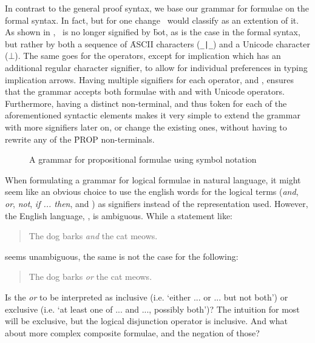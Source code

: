 \documentclass[manual.tex]{subfiles}
\begin{document}
In contrast to the general proof syntax, we base our grammar for
 formulae on the formal syntax. In fact, but for one change \ours\ would 
 classify as an extention of it.
 As shown in , \abs\ is no longer signified by
 \f{bot}, as is the case in the formal syntax, but rather by both a sequence 
 of \f{ASCII} characters (\verb+_|_+) and a Unicode character (\(\bot\)). 
 The same goes for the operators, except for implication which has an
 additional regular character signifier, to allow for individual preferences
 in typing implication arrows. Having multiple signifiers for each
 operator, and , ensures that the grammar
 accepts both formulae with  and with Unicode operators.
 Furthermore, having a distinct non-terminal, and thus \f{token}
 for each of the aforementioned syntactic elements makes it
 very simple to extend the grammar with more signifiers later on, or change
 the existing ones, without having to rewrite any of the \f{PROP} 
 non-terminals.

\begin{figure}[!hb]

\caption{A grammar for propositional formulae using symbol notation}
\label{nlform}
\end{figure}

When formulating a grammar for logical formulae in natural language, it
 might seem like an obvious choice to use the english words
 for the logical terms
 (\emph{and}, \emph{or}, \emph{not}, \emph{if ... then},  and \emph{\abs})
 as signifiers instead of the  representation used. However, 
 the English language, , is
 ambiguous. While a statement like:
 \begin{quote}
    The dog barks \emph{and} the cat meows.
 \end{quote}
 seems unambiguous, the same is not the case for the following:
 \begin{quote}
    The dog barks \emph{or} the cat meows.
 \end{quote}
 Is the \emph{or} to be interpreted as inclusive 
 (i.e. `either ... or ... but not both') or exclusive
 (i.e. `at least one of ... and ..., possibly both')? 
 The intuition for most will be exclusive, but the logical disjunction
 operator is inclusive. And what about more complex composite formulae,
 and the negation of those? 
 
\end{document}
